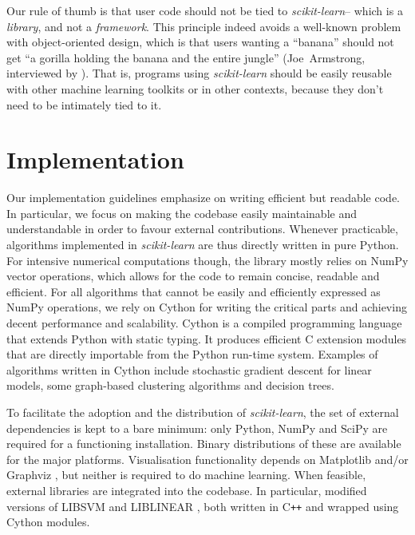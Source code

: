 \documentclass{llncs}
\newcommand{\sklearn}{\textit{scikit-learn}\xspace}
\begin{document}
Our rule of thumb is that user code should not be tied to \sklearn -- which is a
\textit{library}, and not a \textit{framework}. This principle indeed avoids a
well-known problem with object-oriented design, which is that users wanting a
``banana'' should not get ``a gorilla holding the banana and the entire jungle''
(Joe~Armstrong, interviewed by \citealp{seibel2009coders}). That is, programs
using \sklearn should be easily reusable with other machine learning toolkits or
in other contexts, because they don't need to be intimately tied to it.


\section{Implementation}
\label{sec:implementation}

Our implementation guidelines emphasize on writing efficient but readable code.
In particular, we focus on making the codebase easily maintainable and
understandable in order to favour external contributions. Whenever practicable,
algorithms implemented in \sklearn are thus directly written in pure Python. For
intensive numerical computations though, the library mostly relies on NumPy
vector operations, which allows for the code to remain concise, readable and
efficient. For all algorithms that cannot be easily and efficiently expressed as
NumPy operations, we rely on Cython \citep{behnel2011cython}  for writing the
critical parts and achieving decent performance and scalability. Cython is a
compiled programming language that extends Python with static typing. It
produces efficient C extension modules that are directly importable from the
Python run-time system. Examples of algorithms written in Cython include
stochastic gradient descent for linear models, some graph-based clustering
algorithms and decision trees.

To facilitate the adoption and the distribution of \sklearn,
the set of external dependencies is kept to a bare minimum:
only Python, NumPy and SciPy are required for a functioning installation.
Binary distributions of these are available for the major platforms.
Visualisation functionality depends on Matplotlib \citep{hunter2007matplotlib}
and/or Graphviz \citep{gansner2000},
but neither is required to do machine learning.
When feasible, external libraries are integrated into the codebase.
In particular, modified versions of \textsf{LIBSVM} and \textsf{LIBLINEAR}
\citep{chang2011libsvm,fan2008}, both written in C{}\verb!++! and wrapped using
Cython modules.
\end{document}
